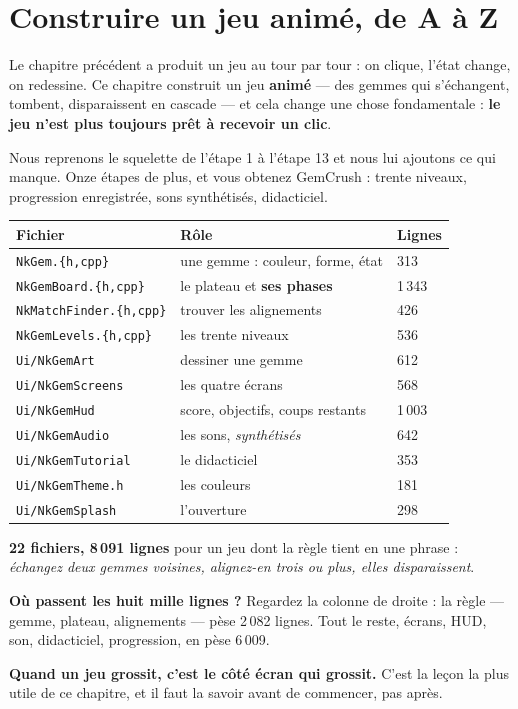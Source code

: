 \chapter{Construire un jeu animé, de A à Z}

Le chapitre précédent a produit un jeu au tour par tour : on clique, l'état
change, on redessine. Ce chapitre construit un jeu \textbf{animé} --- des gemmes
qui s'échangent, tombent, disparaissent en cascade --- et cela change une chose
fondamentale : \textbf{le jeu n'est plus toujours prêt à recevoir un clic}.

Nous reprenons le squelette de l'étape 1 à l'étape 13 et nous lui ajoutons ce
qui manque. Onze étapes de plus, et vous obtenez GemCrush : trente niveaux,
progression enregistrée, sons synthétisés, didacticiel.

\begin{center}
\begin{tabular}{@{}lll@{}}
\toprule
\textbf{Fichier} & \textbf{Rôle} & \textbf{Lignes} \\
\midrule
\texttt{NkGem.\{h,cpp\}} & une gemme : couleur, forme, état & 313 \\
\texttt{NkGemBoard.\{h,cpp\}} & le plateau et \textbf{ses phases} & 1\,343 \\
\texttt{NkMatchFinder.\{h,cpp\}} & trouver les alignements & 426 \\
\texttt{NkGemLevels.\{h,cpp\}} & les trente niveaux & 536 \\
\texttt{Ui/NkGemArt} & dessiner une gemme & 612 \\
\texttt{Ui/NkGemScreens} & les quatre écrans & 568 \\
\texttt{Ui/NkGemHud} & score, objectifs, coups restants & 1\,003 \\
\texttt{Ui/NkGemAudio} & les sons, \emph{synthétisés} & 642 \\
\texttt{Ui/NkGemTutorial} & le didacticiel & 353 \\
\texttt{Ui/NkGemTheme.h} & les couleurs & 181 \\
\texttt{Ui/NkGemSplash} & l'ouverture & 298 \\
\bottomrule
\end{tabular}
\end{center}

\noindent \textbf{22 fichiers, 8\,091 lignes} pour un jeu dont la règle tient en
une phrase : \emph{échangez deux gemmes voisines, alignez-en trois ou plus,
elles disparaissent}.

\begin{nkretenir}
\textbf{Où passent les huit mille lignes ?} Regardez la colonne de droite : la
règle --- gemme, plateau, alignements --- pèse 2\,082 lignes. Tout le reste,
écrans, HUD, son, didacticiel, progression, en pèse 6\,009.

\textbf{Quand un jeu grossit, c'est le côté écran qui grossit.} C'est la leçon
la plus utile de ce chapitre, et il faut la savoir avant de commencer, pas
après.
\end{nkretenir}

